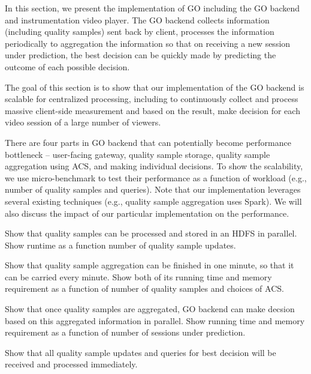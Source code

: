 In this section, we present the implementation of GO including the GO backend and instrumentation video player. The GO backend collects information (including quality samples) sent back by client, processes the information periodically to aggregation the information so that on receiving a new session under prediction, the best decision can be quickly made by predicting the outcome of each possible decision.




The goal of this section is to show that our implementation of the GO backend is scalable for centralized processing, including to continuously collect and process massive client-side measurement and based on the result, make decision for each video session of a large number of viewers. 

There are four parts in GO backend that can potentially become performance bottleneck -- user-facing gateway, quality sample storage, quality sample aggregation using ACS, and making individual decisions. To show the scalability, we use micro-benchmark to test their performance as a function of workload (e.g., number of quality samples and queries).
Note that our implementation leverages several existing techniques (e.g., quality sample aggregation uses Spark). We will also discuss the impact of our particular implementation on the performance.

Show that quality samples can be processed and stored in an HDFS in parallel. Show runtime as a function number of quality sample updates. \fillme

Show that quality sample aggregation can be finished in one minute, so that it can be carried every minute. Show both of its running time and memory requirement as a function of number of quality samples and choices of ACS. \fillme

Show that once quality samples are aggregated, GO backend can make decsion based on this aggregated information in parallel. Show running time and memory requirement as a function of number of sessions under prediction. \fillme

Show that all quality sample updates and queries for best decision will be received and processed immediately. \fillme